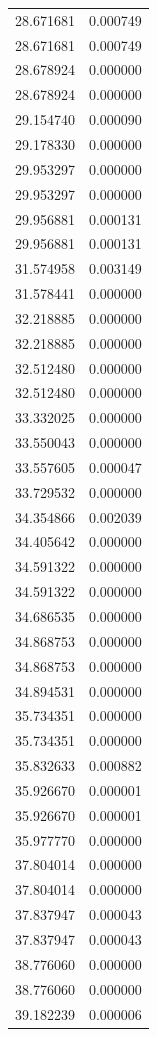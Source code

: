 \begin{longtable}{rr}
28.671681 & 0.000749 \\
28.671681 & 0.000749 \\
28.678924 & 0.000000 \\
28.678924 & 0.000000 \\
29.154740 & 0.000090 \\
29.178330 & 0.000000 \\
29.953297 & 0.000000 \\
29.953297 & 0.000000 \\
29.956881 & 0.000131 \\
29.956881 & 0.000131 \\
31.574958 & 0.003149 \\
31.578441 & 0.000000 \\
32.218885 & 0.000000 \\
32.218885 & 0.000000 \\
32.512480 & 0.000000 \\
32.512480 & 0.000000 \\
33.332025 & 0.000000 \\
33.550043 & 0.000000 \\
33.557605 & 0.000047 \\
33.729532 & 0.000000 \\
34.354866 & 0.002039 \\
34.405642 & 0.000000 \\
34.591322 & 0.000000 \\
34.591322 & 0.000000 \\
34.686535 & 0.000000 \\
34.868753 & 0.000000 \\
34.868753 & 0.000000 \\
34.894531 & 0.000000 \\
35.734351 & 0.000000 \\
35.734351 & 0.000000 \\
35.832633 & 0.000882 \\
35.926670 & 0.000001 \\
35.926670 & 0.000001 \\
35.977770 & 0.000000 \\
37.804014 & 0.000000 \\
37.804014 & 0.000000 \\
37.837947 & 0.000043 \\
37.837947 & 0.000043 \\
38.776060 & 0.000000 \\
38.776060 & 0.000000 \\
39.182239 & 0.000006 \\

\end{longtable}
